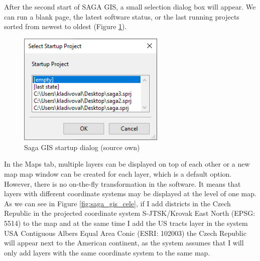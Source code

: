 \documentclass[a4paper,10pt,twoside]{article}
\begin{document}
After the second start of SAGA GIS, a small selection dialog box will appear. We can run a blank page, the latest software status, or the last running projects sorted from newest to oldest (Figure \ref{fig:saga_startup}).

\vspace{0.3cm}
\begin{figure}[hbt!] 
\begin{center}
\includegraphics[width=7cm]{pictures/saga_startup.png} 
\caption[Saga GIS startup dialog (source own)]{Saga GIS startup dialog (source own)}
\label{fig:saga_startup}
\end{center}
\end{figure}

In the Maps tab, multiple layers can be displayed on top of each other or a new map map window can be created for each layer, which is a default option. However, there is no on-the-fly transformation in the software. It means that layers with different coordinate systems may be displayed at the level of one map. As we can see in Figure \ref{fig:saga_gis_cele}, if I add districts in the Czech Republic in the projected coordinate system S-JTSK/Krovak East North (EPSG: 5514) to the map and at the same time I add the US tracts layer in the system USA Contiguous Albers Equal Area Conic (ESRI: 102003) the Czech Republic will appear next to the American continent, as the system assumes that I will only add layers with the same coordinate system to the same map.
\end{document}
